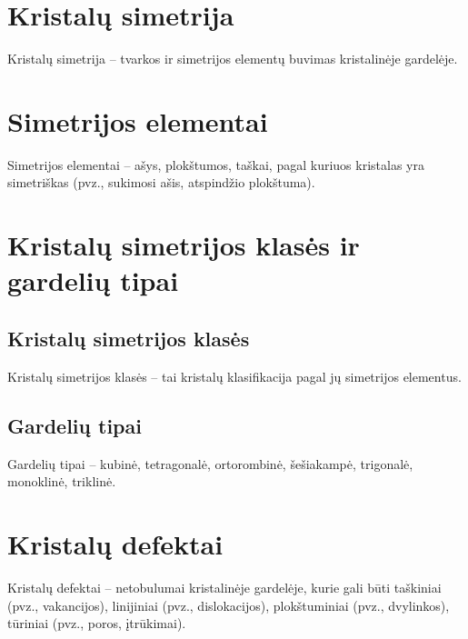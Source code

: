 \documentclass[a4paper,12pt]{article}
\begin{document}
\section{Kristalų simetrija}
Kristalų simetrija – tvarkos ir simetrijos elementų buvimas kristalinėje gardelėje.

\section{Simetrijos elementai}
Simetrijos elementai – ašys, plokštumos, taškai, pagal kuriuos kristalas yra simetriškas (pvz., sukimosi ašis, atspindžio plokštuma).

\section{Kristalų simetrijos klasės ir gardelių tipai}

\subsection{Kristalų simetrijos klasės}
Kristalų simetrijos klasės – tai kristalų klasifikacija pagal jų simetrijos elementus.

\subsection{Gardelių tipai}
Gardelių tipai – kubinė, tetragonalė, ortorombinė, šešiakampė, trigonalė, monoklinė, triklinė.

\section{Kristalų defektai}
Kristalų defektai – netobulumai kristalinėje gardelėje, kurie gali būti taškiniai (pvz., vakancijos), linijiniai (pvz., dislokacijos), plokštuminiai (pvz., dvylinkos), tūriniai (pvz., poros, įtrūkimai).
\end{document}
